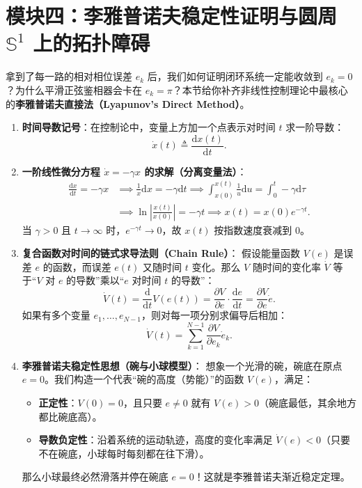 \documentclass[UTF8, a4paper, 11pt]{ctexart}
\newcommand{\Sone}{\mathbb{S}^1}
\newcommand{\dd}{\mathrm{d}}
\begin{document}
\section{模块四：李雅普诺夫稳定性证明与圆周 \texorpdfstring{$\Sone$}{S1} 上的拓扑障碍}

拿到了每一路的相对相位误差 $e_k$ 后，我们如何证明闭环系统一定能收敛到 $e_k = 0$？为什么平滑正弦鉴相器会卡在 $e_k = \pi$？本节给你补齐非线性控制理论中最核心的\textbf{李雅普诺夫直接法（Lyapunov's Direct Method）}。

\begin{mathprep}
\begin{enumerate}[label=\textbf{\arabic*.}]
    \item \textbf{时间导数记号}：在控制论中，变量上方加一个点表示对时间 $t$ 求一阶导数：
    \[
        \dot{x}(t) \triangleq \frac{\dd x(t)}{\dd t}.
    \]
    \item \textbf{一阶线性微分方程 $\dot{x} = -\gamma x$ 的求解（分离变量法）}：
    \begin{align*}
        \frac{\dd x}{\dd t} = -\gamma x
        &\implies \frac{1}{x}\dd x = -\gamma \dd t
        \implies \int_{x(0)}^{x(t)} \frac{1}{u}\dd u = \int_0^t -\gamma \dd \tau \\
        &\implies \ln\left|\frac{x(t)}{x(0)}\right| = -\gamma t
        \implies x(t) = x(0)e^{-\gamma t}.
    \end{align*}
    当 $\gamma > 0$ 且 $t \to \infty$ 时，$e^{-\gamma t} \to 0$，故 $x(t)$ 按指数速度衰减到 $0$。
    \item \textbf{复合函数对时间的链式求导法则（Chain Rule）}：
    假设能量函数 $V(e)$ 是误差 $e$ 的函数，而误差 $e(t)$ 又随时间 $t$ 变化。那么 $V$ 随时间的变化率 $\dot{V}$ 等于“$V$ 对 $e$ 的导数”乘以“$e$ 对时间 $t$ 的导数”：
    \[
        \dot{V}(t) = \frac{\dd}{\dd t} V(e(t)) = \frac{\partial V}{\partial e} \cdot \frac{\dd e}{\dd t} = \frac{\partial V}{\partial e} \dot{e}.
    \]
    如果有多个变量 $e_1, \dots, e_{N-1}$，则对每一项分别求偏导后相加：
    \[
        \dot{V}(t) = \sum_{k=1}^{N-1} \frac{\partial V}{\partial e_k} \dot{e}_k.
    \]
    \item \textbf{李雅普诺夫稳定性思想（碗与小球模型）}：
    想象一个光滑的碗，碗底在原点 $e=0$。我们构造一个代表“碗的高度（势能）”的函数 $V(e)$，满足：
    \begin{itemize}
        \item \textbf{正定性}：$V(0) = 0$，且只要 $e \neq 0$ 就有 $V(e) > 0$（碗底最低，其余地方都比碗底高）。
        \item \textbf{导数负定性}：沿着系统的运动轨迹，高度的变化率满足 $\dot{V}(e) < 0$（只要不在碗底，小球每时每刻都在往下滑）。
    \end{itemize}
    那么小球最终必然滑落并停在碗底 $e = 0$！这就是李雅普诺夫渐近稳定定理。
\end{enumerate}
\end{mathprep}
\end{document}
